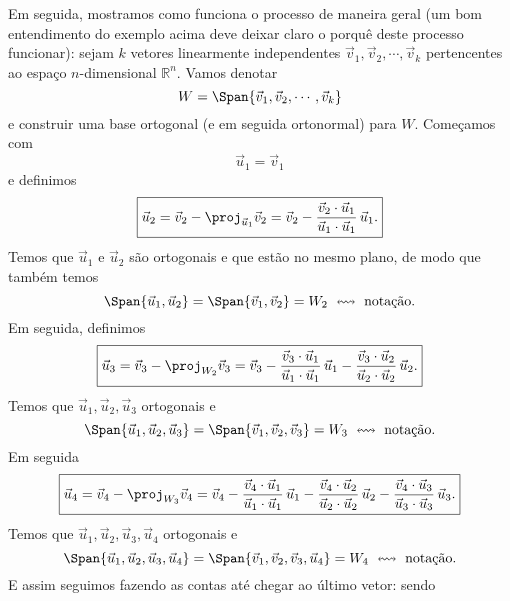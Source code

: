 Em seguida, mostramos como funciona o processo de maneira geral (um bom entendimento do exemplo acima deve deixar claro o porquê deste processo funcionar): sejam $k$ vetores linearmente independentes $\vec{v}_1, \vec{v}_2, \cdots, \vec{v}_k$ pertencentes ao espaço $n$-dimensional $\mathbb{R}^n$. Vamos denotar
\begin{equation}
W = \Span \{\vec{v}_1, \vec{v}_2, \cdots, \vec{v}_k\}
\end{equation} e construir uma base ortogonal (e em seguida ortonormal) para $W$. Começamos com
\begin{equation}
\boxed{\vec{u}_1 = \vec{v}_1}
\end{equation} e definimos
\begin{equation}\label{eqn:Gram-Schmidt-1}
\boxed{\vec{u}_2 = \vec{v}_2 - \proj_{\vec{u}_1} \vec{v}_2 = \vec{v}_2 - \frac{\vec{v}_2 \cdot \vec{u}_1}{\vec{u}_1 \cdot \vec{u}_1} \, \vec{u}_1.}
\end{equation}
 Temos que $\vec{u}_1$ e $\vec{u}_2$ são ortogonais e que estão no mesmo plano, de modo que também temos
\begin{equation}
\Span \{ \vec{u}_1, \vec{u}_2 \} = \Span \{ \vec{v}_1, \vec{v}_2 \} = W_2 \ \leftrightsquigarrow \text{ notação.}
\end{equation} Em seguida, definimos
\begin{equation}\label{eqn:Gram-Schmidt-2}
\boxed{\vec{u}_3 = \vec{v}_3 - \proj_{W_2} \vec{v}_3 = \vec{v}_3 - \frac{\vec{v}_3 \cdot \vec{u}_1}{\vec{u}_1 \cdot \vec{u}_1} \, \vec{u}_1 - \frac{\vec{v}_3 \cdot \vec{u}_2}{\vec{u}_2 \cdot \vec{u}_2} \, \vec{u}_2.}
\end{equation} Temos que $\vec{u}_1, \vec{u}_2, \vec{u}_3$ ortogonais e
\begin{equation}
\Span \{ \vec{u}_1, \vec{u}_2, \vec{u}_3 \} = \Span \{ \vec{v}_1, \vec{v}_2, \vec{v}_3 \} = W_3 \ \leftrightsquigarrow \text{ notação.}
\end{equation} Em seguida
\begin{equation}
\boxed{\vec{u}_4 = \vec{v}_4 - \proj_{W_3} \vec{v}_4 = \vec{v}_4 - \frac{\vec{v}_4 \cdot \vec{u}_1}{\vec{u}_1 \cdot \vec{u}_1} \, \vec{u}_1 - \frac{\vec{v}_4 \cdot \vec{u}_2}{\vec{u}_2 \cdot \vec{u}_2} \, \vec{u}_2 - \frac{\vec{v}_4 \cdot \vec{u}_3}{\vec{u}_3 \cdot \vec{u}_3} \, \vec{u}_3.}
\end{equation} Temos que $\vec{u}_1, \vec{u}_2, \vec{u}_3, \vec{u}_4$ ortogonais e
\begin{equation}
\Span \{ \vec{u}_1, \vec{u}_2, \vec{u}_3, \vec{u}_4 \} = \Span \{ \vec{v}_1, \vec{v}_2, \vec{v}_3, \vec{u}_4 \} = W_4 \ \leftrightsquigarrow \text{ notação.}
\end{equation} E assim seguimos fazendo as contas até chegar ao último vetor: sendo
